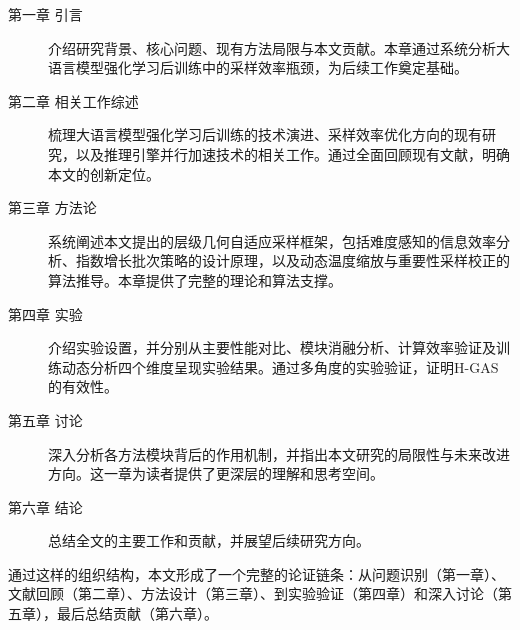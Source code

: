 \begin{description}
    \item[第一章 引言] 介绍研究背景、核心问题、现有方法局限与本文贡献。本章通过系统分析大语言模型强化学习后训练中的采样效率瓶颈，为后续工作奠定基础。
    
    \item[第二章 相关工作综述] 梳理大语言模型强化学习后训练的技术演进、采样效率优化方向的现有研究，以及推理引擎并行加速技术的相关工作。通过全面回顾现有文献，明确本文的创新定位。
    
    \item[第三章 方法论] 系统阐述本文提出的层级几何自适应采样框架，包括难度感知的信息效率分析、指数增长批次策略的设计原理，以及动态温度缩放与重要性采样校正的算法推导。本章提供了完整的理论和算法支撑。
    
    \item[第四章 实验] 介绍实验设置，并分别从主要性能对比、模块消融分析、计算效率验证及训练动态分析四个维度呈现实验结果。通过多角度的实验验证，证明H-GAS的有效性。
    
    \item[第五章 讨论] 深入分析各方法模块背后的作用机制，并指出本文研究的局限性与未来改进方向。这一章为读者提供了更深层的理解和思考空间。
    
    \item[第六章 结论] 总结全文的主要工作和贡献，并展望后续研究方向。
\end{description}

通过这样的组织结构，本文形成了一个完整的论证链条：从问题识别（第一章）、文献回顾（第二章）、方法设计（第三章）、到实验验证（第四章）和深入讨论（第五章），最后总结贡献（第六章）。
